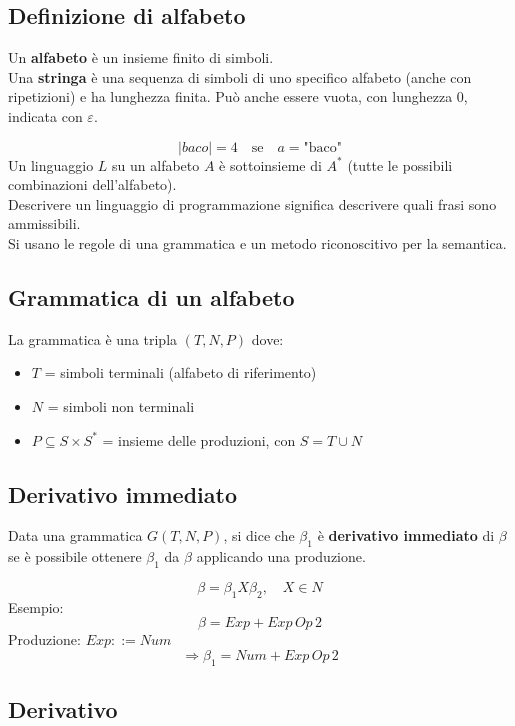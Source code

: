 \documentclass[a4paper,12pt]{article}
\begin{document}
\subsection{Definizione di alfabeto}

Un \textbf{alfabeto} è un insieme finito di simboli.\\
Una \textbf{stringa} è una sequenza di simboli di uno specifico alfabeto (anche con ripetizioni) e ha lunghezza finita.  
Può anche essere vuota, con lunghezza 0, indicata con $\varepsilon$.

\[
|baco| = 4 \quad \text{se} \quad a = \text{"baco"}
\]
Un linguaggio $L$ su un alfabeto $A$ è sottoinsieme di $A^*$ (tutte le possibili combinazioni dell’alfabeto).\\
Descrivere un linguaggio di programmazione significa descrivere quali frasi sono ammissibili.\\
Si usano le regole di una grammatica e un metodo riconoscitivo per la semantica.

\subsection{Grammatica di un alfabeto}

La grammatica è una tripla $(T, N, P)$ dove:
\begin{itemize}
  \item $T$ = simboli terminali (alfabeto di riferimento)
  \item $N$ = simboli non terminali
  \item $P \subseteq S \times S^*$ = insieme delle produzioni, con $S = T \cup N$
\end{itemize}

\subsection{Derivativo immediato}

Data una grammatica $G(T, N, P)$, si dice che $\beta_1$ è \textbf{derivativo immediato} di $\beta$ se è possibile ottenere $\beta_1$ da $\beta$ applicando una produzione.

\[
\beta = \beta_1 X \beta_2, \quad X \in N
\]
Esempio:
\[
\beta = Exp + Exp\, Op\, 2
\]
Produzione: $Exp ::= Num$
\[
\Rightarrow \beta_1 = Num + Exp\, Op\, 2
\]

\subsection{Derivativo}
\end{document}

